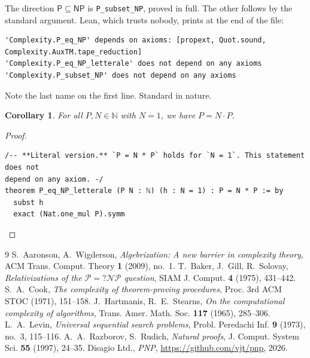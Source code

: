 \documentclass[11pt,a4paper]{amsart}
\newtheorem{corollario}[teorema]{Corollary}
\theoremstyle{remark}
\begin{document}
The direction $\mathsf{P} \subseteq \mathsf{NP}$ is \texttt{P\_subset\_NP},
proved in full. The other follows by the standard argument. Lean, which trusts
nobody, prints at the end of the file:

\begin{listato}[\scriptsize]
\begin{verbatim}
'Complexity.P_eq_NP' depends on axioms: [propext, Quot.sound, Complexity.AuxTM.tape_reduction]
'Complexity.P_eq_NP_letterale' does not depend on any axioms
'Complexity.P_subset_NP' does not depend on any axioms
\end{verbatim}
\end{listato}

\noindent Note the last name on the first line. Standard in nature.

\begin{corollario}\label{cor:lett}
For all $P, N \in \mathbb{N}$ with $N = 1$, we have $P = N \cdot P$.
\end{corollario}

\begin{proof}
\begin{listato}
\begin{verbatim}
/-- **Literal version.** `P = N * P` holds for `N = 1`. This statement does not
depend on any axiom. -/
theorem P_eq_NP_letterale (P N : ℕ) (h : N = 1) : P = N * P := by
  subst h
  exact (Nat.one_mul P).symm
\end{verbatim}
\end{listato}
\end{proof}

\begin{thebibliography}{9}
 S.~Aaronson, A.~Wigderson,
  \emph{Algebrization: A new barrier in complexity theory},
  ACM Trans. Comput. Theory \textbf{1} (2009), no.~1.
 T.~Baker, J.~Gill, R.~Solovay,
  \emph{Relativizations of the $\mathcal{P} =? \mathcal{NP}$ question},
  SIAM J. Comput. \textbf{4} (1975), 431--442.
 S.~A.~Cook,
  \emph{The complexity of theorem-proving procedures},
  Proc. 3rd ACM STOC (1971), 151--158.
 J.~Hartmanis, R.~E.~Stearns,
  \emph{On the computational complexity of algorithms},
  Trans. Amer. Math. Soc. \textbf{117} (1965), 285--306.
 L.~A.~Levin,
  \emph{Universal sequential search problems},
  Probl. Peredachi Inf. \textbf{9} (1973), no.~3, 115--116.
 A.~A.~Razborov, S.~Rudich,
  \emph{Natural proofs},
  J. Comput. System Sci. \textbf{55} (1997), 24--35.
 Disagio Ltd.,
  \emph{PNP}, \url{https://github.com/vjt/pnp}, 2026.
\end{thebibliography}
\end{document}
